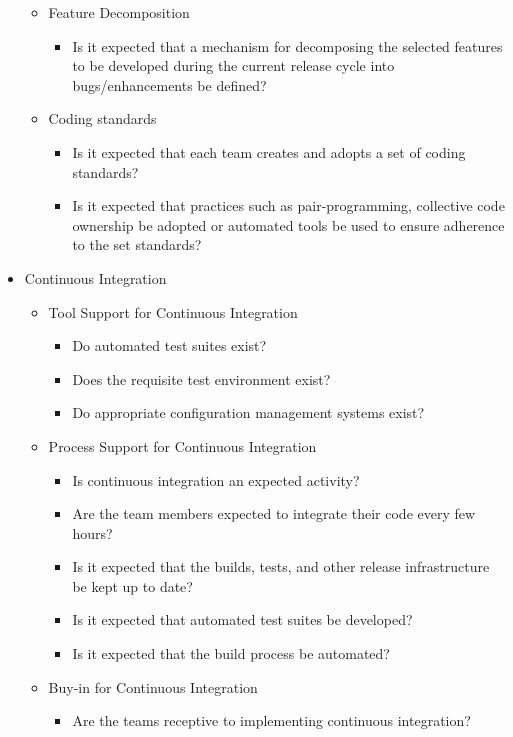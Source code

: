 \begin{appendices}
\begin{itemize}
\begin{itemize}
			\item Feature Decomposition
				\begin{itemize}
					\item Is it expected that a mechanism for decomposing the selected features to be developed during the current release cycle into bugs/enhancements be defined?
				\end{itemize}
			\item Coding standards
				\begin{itemize}
					\item Is it expected that each team creates and adopts a set of coding standards?
					\item Is it expected that practices such as pair-programming, collective code ownership be adopted or automated tools be used to ensure adherence to the set standards?
				\end{itemize}
		\end{itemize}
	\item Continuous Integration
		\begin{itemize}
			\item Tool Support for Continuous Integration
				\begin{itemize}
					\item Do automated test suites exist?
					\item Does the requisite test environment exist?
					\item Do appropriate configuration management systems exist?
				\end{itemize}
			\item Process Support for Continuous Integration
				\begin{itemize}
					\item Is continuous integration an expected activity?
					\item Are the team members expected to integrate their code every few hours?
					\item Is it expected that the builds, tests, and other release infrastructure be kept up to date?
					\item Is it expected that automated test suites be developed?
					\item Is it expected that the build process be automated?
				\end{itemize}
			\item Buy-in for Continuous Integration
				\begin{itemize}
					\item Are the teams receptive to implementing continuous integration?

\end{itemize}
\end{itemize}
\end{itemize}
\end{appendices}
